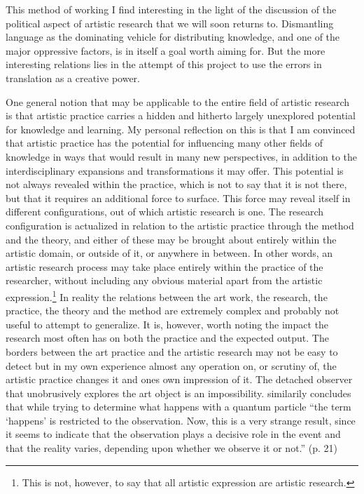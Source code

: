 \documentclass{article}
\begin{document}
This method of working I find interesting in the light of the discussion of the political aspect of artistic research that we will soon returns to. Dismantling language as the dominating vehicle for distributing knowledge, and one of the major oppressive factors, is in itself a goal worth aiming for. But the more interesting relations lies in the attempt of this project to use the errors in translation as a creative power. 

One general notion that may be applicable to the entire field of artistic research is that artistic practice carries a hidden and hitherto largely unexplored potential for knowledge and learning. My personal reflection on this is that I am convinced that artistic practice has the potential for influencing many other fields of knowledge in ways that would result in many new perspectives, in addition to the interdisciplinary expansions and transformations it may offer. This potential is not always revealed within the practice, which is not to say that it is not there, but that it requires an additional force to surface. This force may reveal itself in different configurations, out of which artistic research is one. The research configuration is actualized in relation to the artistic practice through the method and the theory, and either of these may be brought about entirely within the artistic domain, or outside of it, or anywhere in between. In other words, an artistic research process may take place entirely within the practice of the researcher, without including any obvious material apart from the artistic expression.\footnote{This is not, however, to say that all artistic expression are artistic research.} In reality the relations between the art work, the research, the practice, the theory and the method are extremely complex and probably not useful to attempt to generalize. It is, however, worth noting the impact the research most often has on both the practice and the expected output. The borders between the art practice and the artistic research may not be easy to detect but in my own experience almost any operation on, or scrutiny of, the artistic practice changes it and ones own impression of it. The detached observer that unobrusively explores the art object is an impossibility. \citet{heisenberg1958} similarily concludes that while trying to determine what happens with a quantum particle ``the term `happens' is restricted to the observation.  Now, this is a very strange result, since it seems to indicate that the observation plays a decisive role in the event and that the reality varies, depending upon whether we observe it or not.'' (p. 21)
\end{document}
